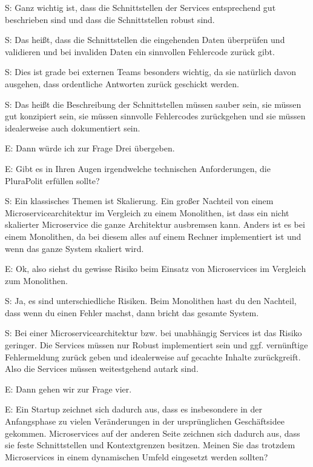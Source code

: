  \label{appendix:s-13}
S: Ganz wichtig ist, dass die Schnittstellen der Services entsprechend gut beschrieben sind und dass die Schnittstellen robust sind.

 \label{appendix:s-14}  \label{appendix:s-15}
S: Das heißt, dass die Schnittstellen die eingehenden Daten überprüfen und validieren und bei invaliden Daten ein sinnvollen Fehlercode zurück gibt.

S: Dies ist grade bei externen Teams besonders wichtig, da sie natürlich davon ausgehen, dass  ordentliche Antworten zurück geschickt werden.

S: Das heißt die Beschreibung der Schnittstellen müssen sauber sein, sie müssen gut konzipiert sein, sie müssen sinnvolle Fehlercodes zurückgehen und sie müssen idealerweise auch dokumentiert sein.

E: Dann würde ich zur Frage Drei übergeben. 

E: Gibt es in Ihren Augen irgendwelche technischen Anforderungen, die PluraPolit erfüllen sollte? 

 \label{appendix:s-16}
S: Ein klassisches Themen ist Skalierung. Ein großer Nachteil von einem Microservicearchitektur im Vergleich zu einem Monolithen, ist dass ein nicht skalierter Microservice die ganze Architektur ausbremsen kann. Anders ist es bei einem Monolithen, da bei diesem alles auf einem Rechner implementiert ist und wenn das ganze System skaliert wird.

E: Ok, also siehst du gewisse Risiko beim Einsatz von Microservices im Vergleich zum Monolithen. 

 \label{appendix:s-17}
S: Ja, es sind unterschiedliche Risiken. Beim Monolithen hast du den Nachteil, dass wenn du einen Fehler machst, dann bricht das gesamte System.

 \label{appendix:s-18}
S: Bei einer Microservicearchitektur bzw. bei unabhängig Services ist das Risiko geringer. Die Services müssen nur Robust implementiert sein und ggf. vernünftige Fehlermeldung zurück geben und idealerweise auf gecachte Inhalte zurückgreift. Also die Services müssen weitestgehend autark sind.

E: Dann gehen wir zur Frage vier.

E: Ein Startup zeichnet sich dadurch aus, dass es insbesondere in der Anfangsphase zu vielen Veränderungen in der ursprünglichen Geschäftsidee gekommen. Microservices auf der anderen Seite zeichnen sich dadurch aus, dass sie feste Schnittstellen und Kontextgrenzen besitzen. Meinen Sie das trotzdem Microservices in einem dynamischen Umfeld eingesetzt werden sollten?

